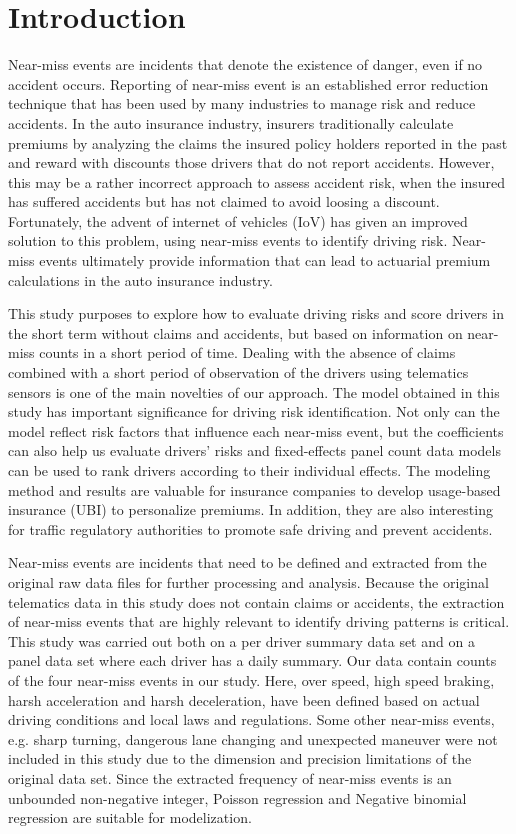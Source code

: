 \documentclass[entropy,article,submit,moreauthors,LaTeX and dvi2pdf]{Definitions/mdpi}
\begin{document}
\section{Introduction}

Near-miss events are incidents that denote the existence of danger, even if no accident occurs. Reporting of near-miss event is an established error reduction technique that has been used by many industries to manage risk and reduce accidents. In the auto insurance industry, insurers traditionally calculate premiums by analyzing the claims the insured policy holders reported in the past and reward with discounts those drivers that do not report accidents. However, this may be a rather incorrect approach to assess accident risk, when the insured has suffered accidents but has not claimed to avoid loosing a discount. Fortunately, the advent of internet of vehicles (IoV) has given an improved solution to this problem, using near-miss events to identify driving risk. Near-miss events ultimately provide information that can lead to actuarial premium calculations in the auto insurance industry\cite{guillen2020can}.

This study purposes to explore how to evaluate driving risks and score drivers in the short term without claims and accidents, but based on information on near-miss counts in a short period of time. Dealing with the absence of claims combined with a short period of observation of the drivers using telematics sensors is one of the main novelties of our approach. The model obtained in this study has important significance for driving risk identification. Not only can the model reflect risk factors that influence each near-miss event, but the coefficients can also help us evaluate drivers' risks and fixed-effects panel count data models can be used to rank drivers according to their individual effects. The modeling method and results are valuable for insurance companies to develop usage-based insurance (UBI) to personalize premiums. In addition, they are also interesting for traffic regulatory authorities to promote safe driving and prevent accidents.

Near-miss events are incidents that need to be defined and extracted from the original raw data files for further processing and analysis. Because the original telematics data in this study does not contain claims or accidents, the extraction of near-miss events that are highly relevant to identify driving patterns is critical. This study was carried out both on a per driver summary data set and on a panel data set where each driver has a daily summary. Our data contain counts of the four near-miss events in our study. Here, over speed, high speed braking, harsh acceleration and harsh deceleration, have been defined based on actual driving conditions and local laws and regulations. Some other near-miss events, e.g. sharp turning, dangerous lane changing and unexpected maneuver were not included in this study due to the dimension and precision limitations of the original data set. Since the extracted frequency of near-miss events is an unbounded non-negative integer, Poisson regression and Negative binomial regression are suitable for modelization.
\end{document}
